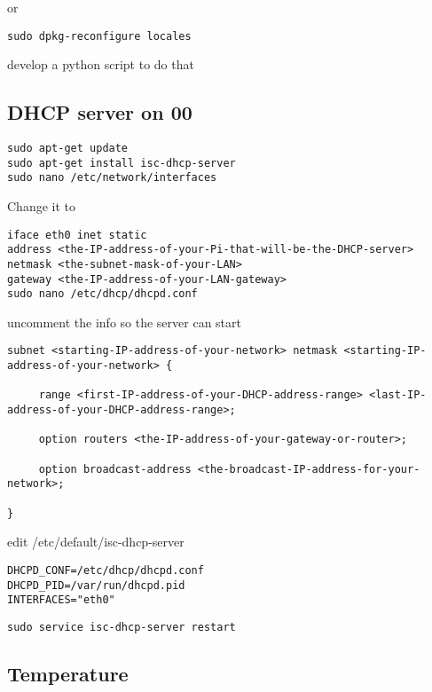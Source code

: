 or

\begin{lstlisting}
sudo dpkg-reconfigure locales
\end{lstlisting}

develop a python script to do that

\subsection{DHCP server on 00}

\begin{lstlisting}
sudo apt-get update
sudo apt-get install isc-dhcp-server
sudo nano /etc/network/interfaces
\end{lstlisting}


Change it to 

\begin{lstlisting}
iface eth0 inet static
address <the-IP-address-of-your-Pi-that-will-be-the-DHCP-server>
netmask <the-subnet-mask-of-your-LAN>
gateway <the-IP-address-of-your-LAN-gateway>
sudo nano /etc/dhcp/dhcpd.conf
\end{lstlisting}

uncomment the info so the server can start

\begin{lstlisting}
subnet <starting-IP-address-of-your-network> netmask <starting-IP-address-of-your-network> {

     range <first-IP-address-of-your-DHCP-address-range> <last-IP-address-of-your-DHCP-address-range>;

     option routers <the-IP-address-of-your-gateway-or-router>;

     option broadcast-address <the-broadcast-IP-address-for-your-network>;

}
\end{lstlisting}

edit /etc/default/isc-dhcp-server

\begin{lstlisting}
DHCPD_CONF=/etc/dhcp/dhcpd.conf
DHCPD_PID=/var/run/dhcpd.pid
INTERFACES="eth0"
\end{lstlisting}

\begin{lstlisting}
sudo service isc-dhcp-server restart
\end{lstlisting}

\subsection{Temperature}

